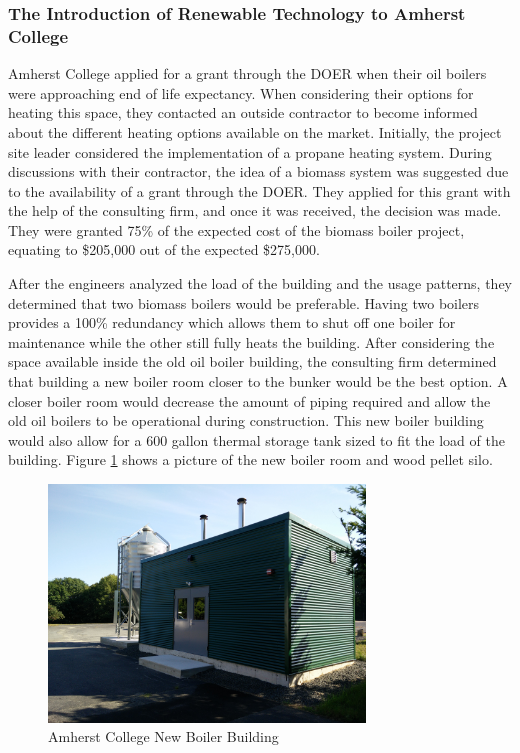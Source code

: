 \subsubsection{The Introduction of Renewable Technology to Amherst College}
\par Amherst College applied for a grant through the DOER when their oil boilers were approaching end of life expectancy. When considering their options for heating this space, they contacted an outside contractor to become informed about the different heating options available on the market. Initially, the project site leader considered the implementation of a propane heating system. During discussions with their contractor, the idea of a biomass system was suggested due to the availability of a grant through the DOER. They applied for this grant with the help of the consulting firm, and once it was received, the decision was made. They were granted 75\% of the expected cost of the biomass boiler project, equating to \$205,000 out of the expected \$275,000.
\par After the engineers analyzed the load of the building and the usage patterns, they determined that two biomass boilers would be preferable. Having two boilers provides a 100\% redundancy which allows them to shut off one boiler for maintenance while the other still fully heats the building. After considering the space available inside the old oil boiler building, the consulting firm determined that building a new boiler room closer to the bunker would be the best option. A closer boiler room would decrease the amount of piping required and allow the old oil boilers to be operational during construction. This new boiler building would also allow for a 600 gallon thermal storage tank sized to fit the load of the building. Figure \ref{fig:boilerroom} shows a picture of the new boiler room and wood pellet silo.
\begin{figure}[H]
\centering
\includegraphics[width=0.75\textwidth]{findingschapter/amherstboilerroom}
\caption{Amherst College New Boiler Building}
\label{fig:boilerroom}
\end{figure}


